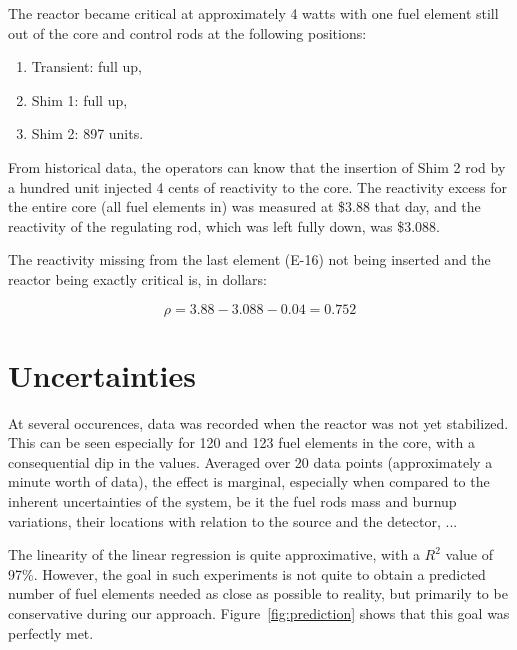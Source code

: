 The reactor became critical at approximately 4 watts with one fuel element still out of the core and control rods at the following positions:
\begin{enumerate}
\item Transient: full up,
\item Shim 1: full up,
\item Shim 2: 897 units.
\end{enumerate}

From historical data, the operators can know that the insertion of Shim 2 rod by a hundred unit injected 4 cents of reactivity to the core. The reactivity excess for the entire core (all fuel elements in) was measured at \$3.88 that day, and the reactivity of the regulating rod, which was left fully down, was \$3.088.

The reactivity missing from the last element (E-16) not being inserted and the reactor being exactly critical is, in dollars:

\begin{equation}\label{eq8}
\rho = 3.88 - 3.088 - 0.04 = 0.752
\end{equation}

\section{Uncertainties}

At several occurences, data was recorded when the reactor was not yet stabilized. This can be seen especially for 120 and 123 fuel elements in the core, with a consequential dip in the values. Averaged over 20 data points (approximately a minute worth of data), the effect is marginal, especially when compared to the inherent uncertainties of the system, be it the fuel rods mass and burnup variations, their locations with relation to the source and the detector, ...

The linearity of the linear regression is quite approximative, with a $R^2$ value of 97\%. However, the goal in such experiments is not quite to obtain a predicted number of fuel elements needed as close as possible to reality, but primarily to be conservative during our approach. Figure~\ref{fig:prediction} shows that this goal was perfectly met.


